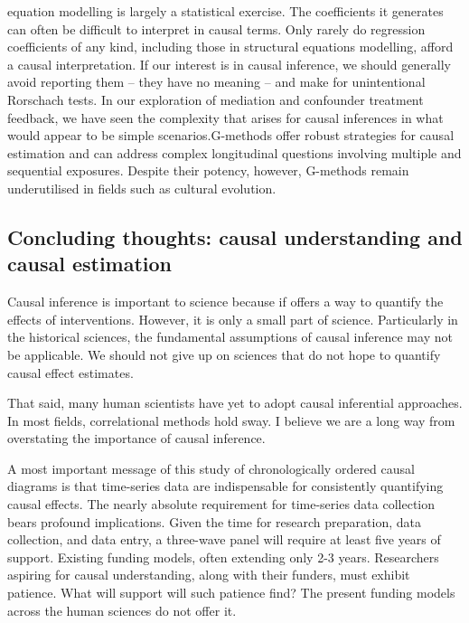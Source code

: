 \documentclass[
  singlecolumn]{report}
\begin{document}
\begin{enumerate}
  equation modelling is largely a statistical exercise. The coefficients
  it generates can often be difficult to interpret in causal terms. Only
  rarely do regression coefficients of any kind, including those in
  structural equations modelling, afford a causal interpretation. If our
  interest is in causal inference, we should generally avoid reporting
  them -- they have no meaning -- and make for unintentional Rorschach
  tests. In our exploration of mediation and confounder treatment
  feedback, we have seen the complexity that arises for causal
  inferences in what would appear to be simple scenarios.G-methods offer
  robust strategies for causal estimation and can address complex
  longitudinal questions involving multiple and sequential exposures.
  Despite their potency, however, G-methods remain underutilised in
  fields such as cultural evolution.
\end{enumerate}

\hypertarget{concluding-thoughts-causal-understanding-and-causal-estimation}{%
\subsection{Concluding thoughts: causal understanding and causal
estimation}\label{concluding-thoughts-causal-understanding-and-causal-estimation}}

Causal inference is important to science because if offers a way to
quantify the effects of interventions. However, it is only a small part
of science. Particularly in the historical sciences, the fundamental
assumptions of causal inference may not be applicable. We should not
give up on sciences that do not hope to quantify causal effect
estimates.

That said, many human scientists have yet to adopt causal inferential
approaches. In most fields, correlational methods hold sway. I believe
we are a long way from overstating the importance of causal inference.

A most important message of this study of chronologically ordered causal
diagrams is that time-series data are indispensable for consistently
quantifying causal effects. The nearly absolute requirement for
time-series data collection bears profound implications. Given the time
for research preparation, data collection, and data entry, a three-wave
panel will require at least five years of support. Existing funding
models, often extending only 2-3 years. Researchers aspiring for causal
understanding, along with their funders, must exhibit patience. What
will support will such patience find? The present funding models across
the human sciences do not offer it.
\end{document}
